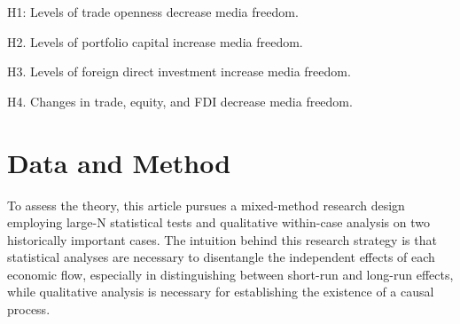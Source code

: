 \documentclass[12pt]{report}
\begin{document}
H1: Levels of trade openness decrease media freedom.

H2. Levels of portfolio capital increase media freedom.

H3. Levels of foreign direct investment increase media freedom.

H4. Changes in trade, equity, and FDI decrease media freedom.

\section{Data and Method}

To assess the theory, this article pursues a mixed-method research design employing large-N
statistical tests and qualitative within-case analysis on two historically important cases. The
intuition behind this research strategy is that statistical analyses are necessary to disentangle
the independent effects of each economic flow, especially in distinguishing between short-run and
long-run effects, while qualitative analysis is necessary for establishing the existence of a causal
process.
\end{document}
